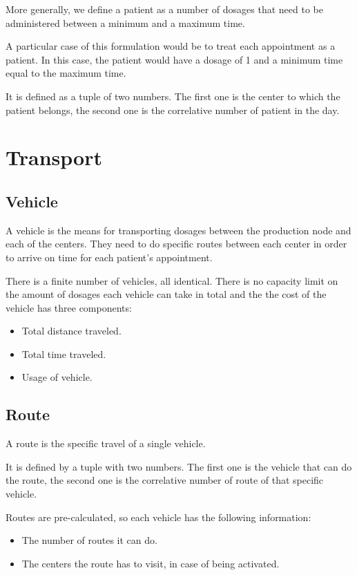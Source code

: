 More generally, we define a patient as a number of dosages that need to be administered between a minimum and a maximum time. 

A particular case of this formulation would be to treat each appointment as a patient. In this case, the patient would have a dosage of 1 and a minimum time equal to the maximum time.

It is defined as a tuple of two numbers. The first one is the center to which the patient belongs, the second one is the correlative number of patient in the day.

\section{Transport}

\subsection{Vehicle}

A vehicle is the means for transporting dosages between the production node and each of the centers. They need to do specific routes between each center in order to arrive on time for each patient's appointment.

There is a finite number of vehicles, all identical. There is no capacity limit on the amount of dosages each vehicle can take in total and the the cost of the vehicle has three components:

\begin{itemize}
	\item Total distance traveled.
	\item Total time traveled.
	\item Usage of vehicle.
\end{itemize}

\subsection{Route}
\label{def:route}

A route is the specific travel of a single vehicle.

It is defined by a tuple with two numbers. The first one is the vehicle that can do the route, the second one is the correlative number of route of that specific vehicle.

Routes are pre-calculated, so each vehicle has the following information:

\begin{itemize}
	\item The number of routes it can do.
	\item The centers the route has to visit, in case of being activated.
\end{itemize}

